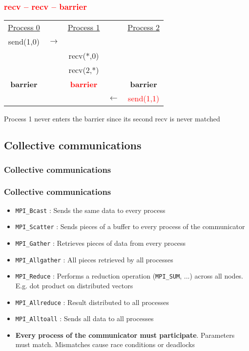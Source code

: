 \begin{frame}[containsverbatim]
\frametitle{\textcolor{red}{recv -- recv -- barrier}}

\begin{tabular}{ c c c c c}
\underline{Process 0} &   & \underline{Process 1} &  & \underline{Process 2} \\
send(1,0) & $\longrightarrow$  &  &  &  \\
          &  & recv(*,0) &    &   \\
          &  & recv(2,*) &      &    \\
\hline
{\bf barrier} &   & \textcolor{red}{{\bf barrier}} &  & {\bf barrier} \\
\hline
 &   &  & $\longleftarrow$ & \textcolor{red}{send(1,1)} \\
\end{tabular}		

Process 1 never enters the barrier since its second recv is never matched
\end{frame}


\subsection{Collective communications}


\begin{frame}[containsverbatim]
\frametitle{Collective communications}

\begin{center}

\end{center}

\end{frame}



\begin{frame}[containsverbatim]
\frametitle{Collective communications}

\begin{itemize}
	\item{\verb+MPI_Bcast+ : Sends the same data to every process}
	\item{\verb+MPI_Scatter+ : Sends pieces of a buffer to every process of the communicator}
	\item{\verb+MPI_Gather+ : Retrieves pieces of data from every process}
	\item{\verb+MPI_Allgather+ : All pieces retrieved by all processes}
	\item{\verb+MPI_Reduce+ : Performs a reduction operation (\verb+MPI_SUM+, ...) across all nodes. E.g. dot product on distributed vectors}
	\item{\verb+MPI_Allreduce+ : Result distributed to all processes }
	\item{\verb+MPI_Alltoall+ : Sends all data to all processes}
	\item{{\bf Every process of the communicator must participate}. Parameters must match. Mismatches cause race conditions or deadlocks}
\end{itemize}

\end{frame}


